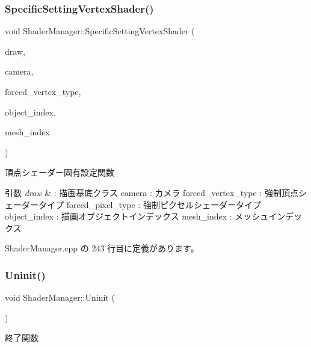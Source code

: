 \subsubsection{\texorpdfstring{Specific\+Setting\+Vertex\+Shader()}{SpecificSettingVertexShader()}}
{\footnotesize\ttfamily void Shader\+Manager\+::\+Specific\+Setting\+Vertex\+Shader (\begin{DoxyParamCaption}\item[{\mbox{\hyperlink{class_draw_base}{Draw\+Base}} $\ast$}]{draw,  }\item[{\mbox{\hyperlink{class_camera}{Camera}} $\ast$}]{camera,  }\item[{\mbox{\hyperlink{class_shader_manager_a9b51e49d70eb3cc58f6d1f3994e8cfbd}{Vertex\+Shader\+Type}}}]{forced\+\_\+vertex\+\_\+type,  }\item[{unsigned}]{object\+\_\+index,  }\item[{unsigned}]{mesh\+\_\+index }\end{DoxyParamCaption})\hspace{0.3cm}{\ttfamily [private]}}



頂点シェーダー固有設定関数 


\begin{DoxyParams}{引数}
{\em draw} & \+: 描画基底クラス camera \+: カメラ forced\+\_\+vertex\+\_\+type \+: 強制頂点シェーダータイプ forced\+\_\+pixel\+\_\+type \+: 強制ピクセルシェーダータイプ object\+\_\+index \+: 描画オブジェクトインデックス mesh\+\_\+index \+: メッシュインデックス \\
\hline
\end{DoxyParams}


 Shader\+Manager.\+cpp の 243 行目に定義があります。

\mbox{\label{class_shader_manager_afc31a6bbe86e6b57edd7be0972f48ab1}} 
\subsubsection{\texorpdfstring{Uninit()}{Uninit()}}
{\footnotesize\ttfamily void Shader\+Manager\+::\+Uninit (\begin{DoxyParamCaption}{ }\end{DoxyParamCaption})}



終了関数 



